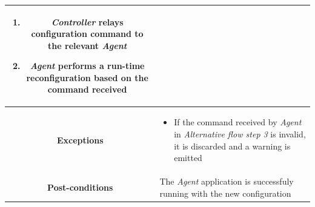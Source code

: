 \documentclass[12pt,a4paper,table]{article}
\begin{document}
\begin{longtable}{ |c|p{11.8cm}| }
{\begin{enumerate}
                        \item \textit{Controller} relays configuration command to the relevant \textit{Agent}
                        \item \textit{Agent} performs a run-time reconfiguration based on the command received
                    \end{enumerate}
                }\\ \hline
                \cellcolor[gray]{0.9} \textbf{Exceptions} & 
                    \begin{itemize}
                        \item If the command received by \textit{Agent} in \textit{Alternative flow step 3} is invalid, it is discarded and a warning is emitted 
                    \end{itemize}\\ \hline
                \cellcolor[gray]{0.9} \textbf{Post-conditions} & The \textit{Agent} application is successfuly running with the new configuration\\ \hline
            \end{longtable}
\end{document}
